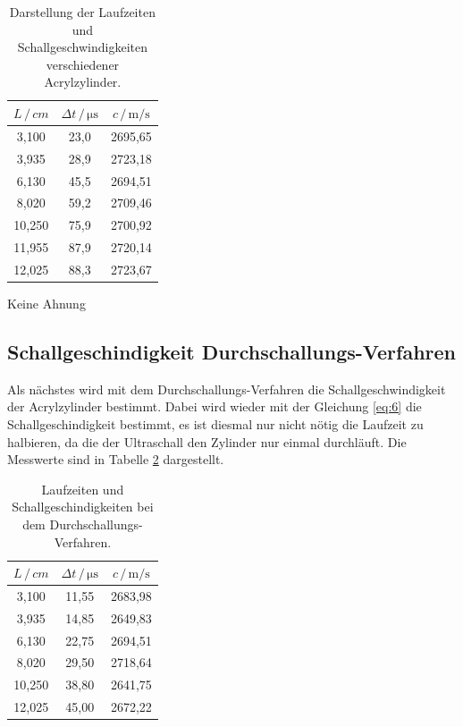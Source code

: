 \begin{table}[H]
  \centering
  \caption{Darstellung der Laufzeiten und Schallgeschwindigkeiten verschiedener
  Acrylzylinder.}
  \label{tab:4}
  \begin{tabular}{c c c}
    \toprule
    $L \, / \, cm$ & $\Delta t \, / \, \si{\micro\second}$ & $c \, / \, \si{\meter\per\second}$ \\
    \midrule
     3,100 & 23,0 & 2695,65 \\
     3,935 & 28,9 & 2723,18 \\
     6,130 & 45,5 & 2694,51 \\
     8,020 & 59,2 & 2709,46 \\
    10,250 & 75,9 & 2700,92 \\
    11,955 & 87,9 & 2720,14 \\
    12,025 & 88,3 & 2723,67 \\
    \bottomrule
  \end{tabular}
\end{table}

Keine Ahnung

\subsection{Schallgeschindigkeit Durchschallungs-Verfahren}

Als nächstes wird mit dem Durchschallungs-Verfahren die Schallgeschwindigkeit
der Acrylzylinder bestimmt. Dabei wird wieder mit der Gleichung \ref{eq:6} die
Schallgeschindigkeit bestimmt, es ist diesmal nur nicht nötig die Laufzeit zu halbieren,
da die der Ultraschall den Zylinder nur einmal durchläuft. Die Messwerte sind in
Tabelle \ref{tab:5} dargestellt.

\begin{table}[H]
  \centering
  \caption{Laufzeiten und Schallgeschindigkeiten bei dem Durchschallungs-Verfahren.}
  \label{tab:5}
  \begin{tabular}{c c c}
    \toprule
    $L \, / \, cm$ & $\Delta t \, / \, \si{\micro\second}$ & $c \, / \, \si{\meter\per\second}$ \\
    \midrule
     3,100 & 11,55 & 2683,98 \\
     3,935 & 14,85 & 2649,83 \\
     6,130 & 22,75 & 2694,51 \\
     8,020 & 29,50 & 2718,64 \\
    10,250 & 38,80 & 2641,75 \\
    12,025 & 45,00 & 2672,22 \\
    \bottomrule
  \end{tabular}
\end{table}
